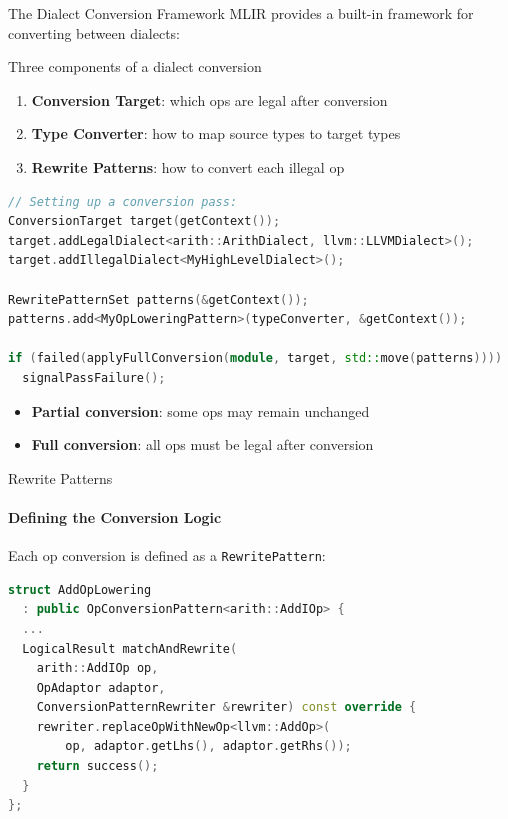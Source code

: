 \begin{frame}[fragile,shrink=5]{The Dialect Conversion Framework}
  \bigskip
  MLIR provides a built-in framework for converting between dialects:

  \begin{block}{Three components of a dialect conversion}
    \begin{enumerate}
      \item \textbf{Conversion Target}: which ops are legal after conversion
      \item \textbf{Type Converter}: how to map source types to target types
      \item \textbf{Rewrite Patterns}: how to convert each illegal op
    \end{enumerate}
  \end{block}

\begin{lstlisting}[language=C++,basicstyle=\ttfamily\footnotesize]
// Setting up a conversion pass:
ConversionTarget target(getContext());
target.addLegalDialect<arith::ArithDialect, llvm::LLVMDialect>();
target.addIllegalDialect<MyHighLevelDialect>();

RewritePatternSet patterns(&getContext());
patterns.add<MyOpLoweringPattern>(typeConverter, &getContext());

if (failed(applyFullConversion(module, target, std::move(patterns))))
  signalPassFailure();
\end{lstlisting}

  \begin{itemize}
    \item \textbf{Partial conversion}: some ops may remain unchanged
    \item \textbf{Full conversion}: all ops must be legal after conversion
  \end{itemize}
\end{frame}


\begin{frame}[fragile]{Rewrite Patterns}
  \framesubtitle{Defining the Conversion Logic}

  Each op conversion is defined as a \texttt{RewritePattern}:

  \bigskip
\begin{lstlisting}[language=C++,basicstyle=\ttfamily\small]
struct AddOpLowering
  : public OpConversionPattern<arith::AddIOp> {
  ...
  LogicalResult matchAndRewrite(
    arith::AddIOp op,
    OpAdaptor adaptor,
    ConversionPatternRewriter &rewriter) const override {
    rewriter.replaceOpWithNewOp<llvm::AddOp>(
        op, adaptor.getLhs(), adaptor.getRhs());
    return success();
  }
};
\end{lstlisting}
\end{frame}


